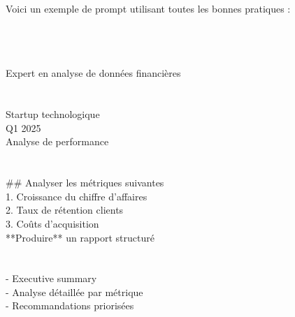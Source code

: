 \begin{Exemple}
    Voici un exemple de prompt utilisant toutes les bonnes pratiques :

    \begin{MultiColonnes}{2}
        \tcbitem \ttfamily\small
        \\[0.5em]
        \\
        \hspace{1em}\\
        \hspace{2em}Expert en analyse de données financières\\
        \hspace{1em}\\[0.5em]
        \hspace{1em}\\
        \hspace{2em}Startup technologique\\
        \hspace{2em}Q1 2025\\
        \hspace{2em}Analyse de performance\\
        \hspace{1em}\\[0.5em]
        
        \tcbitem \ttfamily\small \hspace{1em}\\
        \hspace{2em}\#\# Analyser les métriques suivantes\\
        \hspace{2em}1. Croissance du chiffre d'affaires\\
        \hspace{2em}2. Taux de rétention clients\\
        \hspace{2em}3. Coûts d'acquisition\\[0.5em]
        \hspace{2em}**Produire** un rapport structuré\\
        \hspace{1em}\\[0.5em]
        \hspace{1em}\\
        \hspace{2em}- Executive summary\\
        \hspace{2em}- Analyse détaillée par métrique\\
        \hspace{2em}- Recommandations priorisées\\
        \hspace{1em}\\
    \end{MultiColonnes}
    

\end{Exemple}
